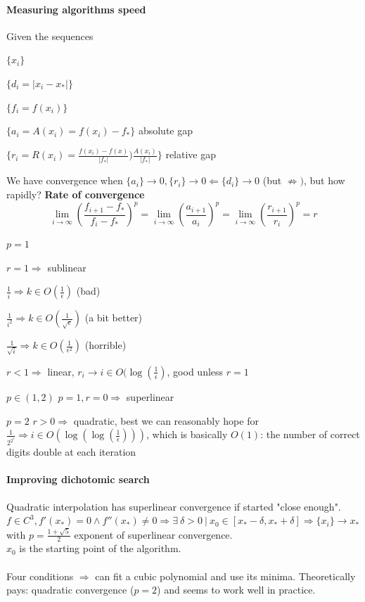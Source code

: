 \documentclass[10pt]{report}
\begin{document}
\paragraph{Measuring algorithms speed} Given the sequences \begin{list}{}{}
	\item $\{x_i\}$
	\item $\{d_i = |x_i - x_*|\}$
	\item $\{f_i = f(x_i)\}$
	\item $\{a_i = A(x_i) = f(x_i) - f_*\}$ absolute gap
	\item $\{r_i = R(x_i) = \frac{f(x_i) - f(x)}{|f_*|} ) \frac{A(x_i)}{|f_*|}\}$ relative gap
\end{list}
We have convergence when $\{a_i\} \rightarrow 0, \{r_i\} \rightarrow 0 \Leftarrow \{d_i\} \rightarrow 0$ (but $\not\Rightarrow)$, but how rapidly? \textbf{Rate of convergence}
$$\lim_{i\to\infty} \left(\frac{f_{i+1} - f_*}{f_i - f_*}\right)^p = \lim_{i\to\infty} \left(\frac{a_{i+1}}{a_i}\right)^p = \lim_{i\to\infty} \left(\frac{r_{i+1}}{r_i}\right)^p = r$$
\begin{list}{}{}
	\item[$p = 1$]\begin{list}{}{}
		\item $r = 1\Rightarrow$ sublinear \begin{list}{}{}
			\item $\frac{1}{i} \Rightarrow k \in O(\frac{1}{\epsilon})$ (bad)
			\item $\frac{1}{i^2} \Rightarrow k \in O(\frac{1}{\sqrt{\epsilon}})$ (a bit better)
			\item $\frac{1}{\sqrt{i}} \Rightarrow k \in O(\frac{1}{\epsilon^2})$ (horrible)
		\end{list}
		\item $r < 1\Rightarrow$ linear, $r_i \rightarrow i \in O(\log(\frac{1}{\epsilon})$, good unless $r = 1$
	\end{list}
	\item[$p \in (1,2)$] $p = 1, r = 0\Rightarrow$ superlinear
	\item[$p = 2$] $r > 0\Rightarrow$ quadratic, best we can reasonably hope for\\
	$\frac{1}{2^{2^i}} \Rightarrow i \in O(\log(\log(\frac{1}{\epsilon})))$, which is basically $O(1)$: the number of correct digits double at each iteration
\end{list}
\paragraph{Improving dichotomic search} Quadratic interpolation has superlinear convergence if started "close enough".\\
$f\in C^3, f'(x_*) = 0 \wedge f''(x_*)\neq 0 \Rightarrow \exists\:\delta > 0\:|\:x_0 \in [x_* - \delta, x_* + \delta] \Rightarrow \{x_i\} \rightarrow x_*$ with $p = \frac{1 + \sqrt{5}}{2}$ exponent of superlinear convergence.\\$x_0$ is the starting point of the algorithm.\\\\
Four conditions $\Rightarrow$ can fit a cubic polynomial and use its minima. Theoretically pays: quadratic convergence ($p = 2$) and seems to work well in practice.
\end{document}
